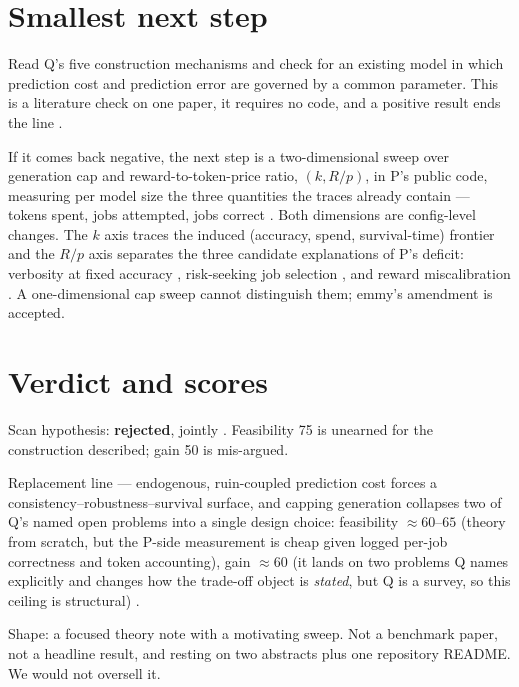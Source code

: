 \documentclass{article}
\begin{document}
\section{Smallest next step}

Read Q's five construction mechanisms and check for an existing model in which prediction
cost and prediction error are governed by a common parameter. This is a literature check on
one paper, it requires no code, and a positive result ends the line .

If it comes back negative, the next step is a two-dimensional sweep over generation cap and
reward-to-token-price ratio, \((k, R/p)\), in P's public code, measuring per model size the
three quantities the traces already contain --- tokens spent, jobs attempted, jobs correct
. Both dimensions are config-level changes. The \(k\) axis traces the induced
(accuracy, spend, survival-time) frontier and the \(R/p\) axis separates the three candidate
explanations of P's deficit: verbosity at fixed accuracy , risk-seeking job
selection , and reward miscalibration . A one-dimensional cap sweep
 cannot distinguish them; emmy's amendment  is accepted.

\section{Verdict and scores}

Scan hypothesis: \textbf{rejected}, jointly . Feasibility 75 is
unearned for the construction described; gain 50 is mis-argued.

Replacement line --- endogenous, ruin-coupled prediction cost forces a
consistency--robustness--survival surface, and capping generation collapses two of Q's
named open problems into a single design choice: feasibility \(\approx 60\text{--}65\)
(theory from scratch, but the P-side measurement is cheap given logged per-job correctness
and token accounting), gain \(\approx 60\) (it lands on two problems Q names explicitly and
changes how the trade-off object is \emph{stated}, but Q is a survey, so this ceiling is
structural) .

Shape: a focused theory note with a motivating sweep. Not a benchmark paper, not a headline
result, and resting on two abstracts plus one repository README. We would not oversell it.
\end{document}
